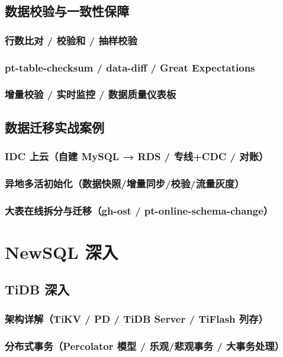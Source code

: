 \documentclass[12pt,UTF8]{ctexbook}
\begin{document}
  \section{数据校验与一致性保障}
    \subsection{行数比对 / 校验和 / 抽样校验}
    \subsection{pt-table-checksum / data-diff / Great Expectations}
    \subsection{增量校验 / 实时监控 / 数据质量仪表板}

  \section{数据迁移实战案例}
    \subsection{IDC 上云（自建 MySQL → RDS / 专线+CDC / 对账）}
    \subsection{异地多活初始化（数据快照/增量同步/校验/流量灰度）}
    \subsection{大表在线拆分与迁移（gh-ost / pt-online-schema-change）}


\chapter{NewSQL 深入}
\label{chap:newsql-deep}

  \section{TiDB 深入}
    \subsection{架构详解（TiKV / PD / TiDB Server / TiFlash 列存）}
    \subsection{分布式事务（Percolator 模型 / 乐观/悲观事务 / 大事务处理）}
\end{document}
